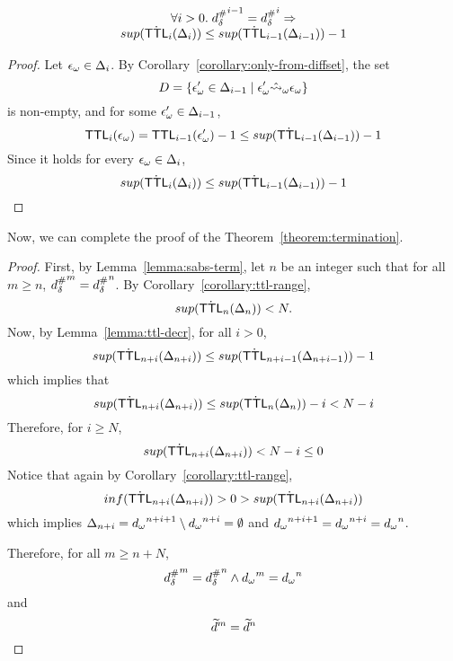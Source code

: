 \begin{lemma}\label{lemma:ttl-decr}
  \[
    \begin{array}{c}
      \forall i > 0. \; {{d}^{\#}_\delta}^{i-1} = {{d}^{\#}_\delta}^i \Rightarrow \\
      sup(\dot {\textsf{TTL}}_i(\Delta_i)) \leq sup(\dot {\textsf{TTL}}_{i-1}(\Delta_{i-1})) - 1
    \end{array}
  \]
\end{lemma}
\begin{proof}
  Let ${\epsilon}_\omega \in \Delta_i$.
  By Corollary~\ref{corollary:only-from-diffset}, the set
  \[
    D = \{{\epsilon}_\omega' \in \Delta_{i-1} \mid {\epsilon}_\omega' \hat{\leadsto}_\omega {\epsilon}_\omega\}
  \]
  is non-empty, and for some ${\epsilon}_\omega' \in \Delta_{i-1}$,
  \[
    \textsf{TTL}_i({\epsilon}_\omega) = \textsf{TTL}_{i-1}({\epsilon}_\omega') - 1 \leq sup(\dot {\textsf{TTL}}_{i-1}(\Delta_{i-1})) - 1
  \]
  Since it holds for every ${\epsilon}_\omega \in \Delta_i$,
  \[
    sup(\dot {\textsf{TTL}}_i(\Delta_i)) \leq sup(\dot {\textsf{TTL}}_{i-1}(\Delta_{i-1})) - 1
  \]
\end{proof}

Now, we can complete the proof of the Theorem~\ref{theorem:termination}.

\begin{proof}
First, by Lemma~\ref{lemma:sabs-term}, let $n$ be an integer such that
for all $m \geq n$, ${{d}^{\#}_\delta}^m = {{d}^{\#}_\delta}^n$.
By Corollary~\ref{corollary:ttl-range},
\[
  sup(\dot {\textsf{TTL}}_n(\Delta_n)) < N.
\]
Now, by Lemma~\ref{lemma:ttl-decr}, for all $i>0$,
\[
  sup(\dot {\textsf{TTL}}_{n+i}(\Delta_{n+i})) \leq sup(\dot {\textsf{TTL}}_{n+i-1}(\Delta_{n+i-1})) - 1
\]
which implies that
\[
  sup(\dot {\textsf{TTL}}_{n+i}(\Delta_{n+i})) \leq sup(\dot {\textsf{TTL}}_n(\Delta_n)) - i < N - i
\]
Therefore, for $i \geq N$,
\[
  sup(\dot {\textsf{TTL}}_{n+i}(\Delta_{n+i})) < N - i \leq 0
\]
Notice that again by Corollary~\ref{corollary:ttl-range},
\[
  inf(\dot {\textsf{TTL}}_{n+i}(\Delta_{n+i})) > 0 > sup(\dot {\textsf{TTL}}_{n+i}(\Delta_{n+i}))
\]
which implies $\Delta_{n+i} = {{d}_\omega}^{n+i+1} \setminus {{d}_\omega}^{n+i} = \emptyset$ and
${{d}_\omega}^{n+i+1} = {{d}_\omega}^{n+i} = {{d}_\omega}^n$.

Therefore, for all $m \geq n + N$,
\[
  {{d}^{\#}_\delta}^m = {{d}^{\#}_\delta}^n \wedge {{d}_\omega}^m = {{d}_\omega}^n
\]
and
\[
  \widetilde{d}^m = \widetilde{d}^n
\]

\end{proof}
